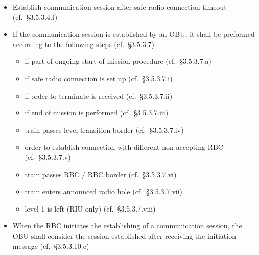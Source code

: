\documentclass{template/openetcs_article}
\begin{document}
\begin{itemize}
\item Establish communication session after safe radio connection timeout
  (cf.~§3.5.3.4.f)
\item If the communication session is established by an OBU, it shall be
  preformed according to the following steps (cf.~§3.5.3.7)
  \begin{itemize}
  \item if part of ongoing start of mission procedure (cf.~§3.5.3.7.a)
  \item if safe radio connection is set up (cf.~§3.5.3.7.i)
  \item if order to terminate is received (cf.~§3.5.3.7.ii)
  \item if end of mission is performed (cf.~§3.5.3.7.iii)
  \item train passes level transition border (cf.~§3.5.3.7.iv)
  \item order to establish connection with different non-accepting RBC
    (cf.~§3.5.3.7.v)
  \item train passes RBC / RBC border (cf.~§3.5.3.7.vi)
  \item train enters announced radio hole (cf.~§3.5.3.7.vii)
  \item level 1 is left (RIU only) (cf.~§3.5.3.7.viii)
  \end{itemize}
\item When the RBC initiates the establishing of a communication session, the
  OBU shall consider the session established after receiving the initiation
  message (cf.~§3.5.3.10.c)
\end{itemize}





\end{document}
